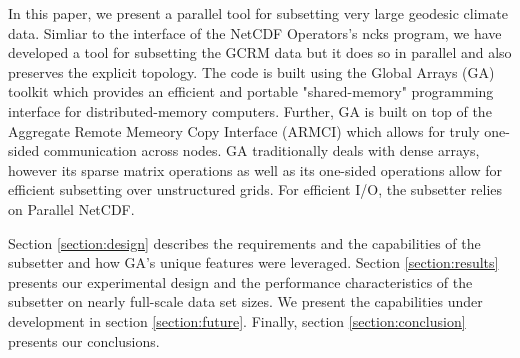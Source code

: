 In this paper, we present a parallel tool for subsetting very large geodesic
climate data.  Simliar to the interface of the NetCDF Operators's\cite{NCO}
ncks program, we have developed a tool for subsetting the GCRM data but it
does so in parallel and also preserves the explicit topology.  The code is
built using the Global Arrays (GA) toolkit which provides an efficient and
portable "shared-memory" programming interface for distributed-memory
computers.\cite{GA}  Further, GA is built on top of the Aggregate Remote
Memeory Copy Interface (ARMCI)\cite{ARMCI} which allows for truly one-sided
communication across nodes.  GA traditionally deals with dense arrays, however
its sparse matrix operations as well as its one-sided operations allow for
efficient subsetting over unstructured grids.  For efficient I/O, the
subsetter relies on Parallel NetCDF.

Section \ref{section:design} describes the requirements and the capabilities
of the subsetter and how GA's unique features were leveraged.  Section
\ref{section:results} presents our experimental design and the performance
characteristics of the subsetter on nearly full-scale data set sizes.  We
present the capabilities under development in section \ref{section:future}.
Finally, section \ref{section:conclusion} presents our conclusions.
